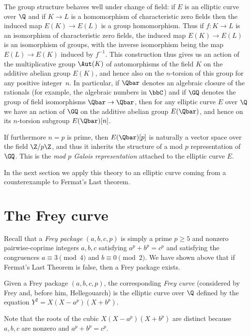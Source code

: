 The group structure behaves well under change of field: if $E$ is an elliptic curve over $\Q$
and if $K\to L$ is a homomorphism of
characteristic zero fields then the induced map $E(K)\to E(L)$ is a group homomorphism.
Thus if $f:K\to L$ is an isomorphism of characteristic zero fields, the induced map $E(K)\to E(L)$
is an isomorphism of groups, with the inverse isomorphism being the map $E(L)\to E(K)$ induced
by $f^{-1}$. This construction thus gives us an action of the multiplicative group $\Aut(K)$
of automorphisms of the field $K$ on the additive abelian group $E(K)$, and hence also
on the $n$-torsion of this group for any positive integer~$n$.
In particular, if $\Qbar$ denotes an algebraic closure of the
rationals (for example, the algebraic numbers in $\bbC$) and if $\GQ$ denotes the group of field
isomorphisms $\Qbar\to\Qbar$, then for any elliptic curve $E$ over $\Q$ we have an action
of $\GQ$ on the additive abelian group $E(\Qbar)$, and hence on its $n$-torsion subgroup
$E(\Qbar)[n]$.

If furthermore $n=p$ is prime, then $E(\Qbar)[p]$ is naturally a vector space over the field $\Z/p\Z$,
and thus it inherits the structure of a mod $p$ representation of $\GQ$.
This is the \emph{mod $p$ Galois representation} attached to the elliptic curve $E$.

In the next section we apply this theory to an elliptic curve coming from a counterexample to Fermat's Last theorem.

\section{The Frey curve}

Recall that a \emph{Frey package} $(a,b,c,p)$ is simply a prime $p\geq5$ and nonzero pairwise-coprime
integers $a,b,c$ satisfying $a^p+b^p=c^p$ and satisfying the congruences
$a\equiv3\pmod4$ and $b\equiv0\pmod2$. We have shown above that if Fermat's Last Theorem is false,
then a Frey package exists.

\begin{definition}[Frey]
  \label{FLT.FreyCurve}
  \leanok
  Given a Frey package $(a,b,c,p)$, the corresponding \emph{Frey curve} (considered by Frey and,
  before him, Hellegouarch) is the elliptic curve over $\Q$ defined by the equation
  $Y^2=X(X-a^p)(X+b^p).$
\end{definition}

Note that the roots of the cubic $X(X-a^p)(X+b^p)$ are distinct because $a,b,c$ are nonzero and
$a^p+b^p=c^p$.

